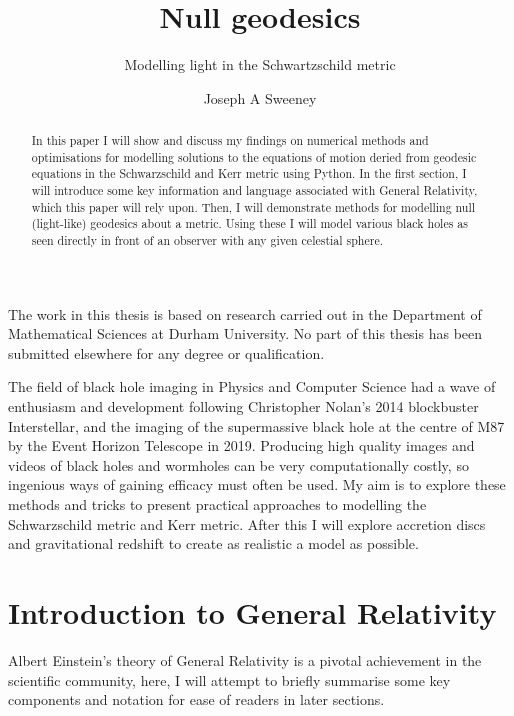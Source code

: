 \documentclass[oneside,openright,frontopenright]{dmathesis}
\begin{document}
\title{Null geodesics}
\subtitle{Modelling light in the Schwartzschild metric}
\author{Joseph A Sweeney}
\maketitlepage*

\begin{abstract}
%
	In this paper I will show and discuss my findings on numerical methods and optimisations for modelling solutions to the equations of motion deried from geodesic equations in the Schwarzschild and Kerr metric using Python. In the first section, I will introduce some key information and language associated with General Relativity, which this paper will rely upon. Then, I will demonstrate methods for modelling null (light-like) geodesics about a metric. Using these I will model various black holes as seen directly in front of an observer with any given celestial sphere.
%
\end{abstract}

\begin{declaration*}
%
	The work in this thesis is based on research carried out in the Department of
	Mathematical Sciences at Durham University. No part of this thesis has been
	submitted elsewhere for any degree or qualification.
%
\end{declaration*}

\disableprotrusion
\tableofcontents*
\enableprotrusion

\cleardoublepage
{}

%
%
%
%
\begin{introduction}

	The field of black hole imaging in Physics and Computer Science had a wave of enthusiasm 
	and development following Christopher Nolan’s 2014 blockbuster Interstellar\cite{Interstellar}, and the imaging of the supermassive 
	black hole at the centre of M87 by the Event Horizon Telescope in 2019\cite{event2019first}. Producing high quality images 
	and videos of black holes and wormholes can be very computationally costly, so ingenious ways of gaining 
	efficacy must often be used. My aim is to explore these methods and tricks to present practical approaches 
	to modelling the Schwarzschild metric and Kerr metric. After this I will explore accretion discs and gravitational redshift to create as realistic a model as possible.

\end{introduction}

\chapter{Introduction to General Relativity}
	Albert Einstein’s theory of General Relativity is a pivotal achievement in the scientific community, here, I will attempt to briefly summarise some key components and notation for ease of readers in later sections.
\end{document}

